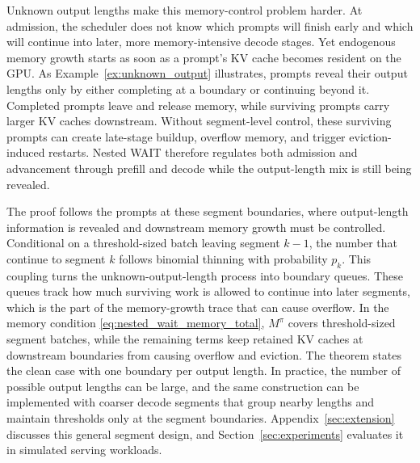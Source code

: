 Unknown output lengths make this memory-control problem harder. At admission, the scheduler does not know which prompts will finish early and which will continue into later, more memory-intensive decode stages. Yet endogenous memory growth starts as soon as a prompt's KV cache becomes resident on the GPU. As Example~\ref{ex:unknown_output} illustrates, prompts reveal their output lengths only by either completing at a boundary or continuing beyond it. Completed prompts leave and release memory, while surviving prompts carry larger KV caches downstream. Without segment-level control, these surviving prompts can create late-stage buildup, overflow memory, and trigger eviction-induced restarts. Nested WAIT therefore regulates both admission and advancement through prefill and decode while the output-length mix is still being revealed.

The proof follows the prompts at these segment boundaries, where output-length information is revealed and downstream memory growth must be controlled. Conditional on a threshold-sized batch leaving segment \(k-1\), the number that continue to segment \(k\) follows binomial thinning with probability \(p_k\). This coupling turns the unknown-output-length process into boundary queues. These queues track how much surviving work is allowed to continue into later segments, which is the part of the memory-growth trace that can cause overflow. In the memory condition \eqref{eq:nested_wait_memory_total}, \(M^\pi\) covers threshold-sized segment batches, while the remaining terms keep retained KV caches at downstream boundaries from causing overflow and eviction. The theorem states the clean case with one boundary per output length. In practice, the number of possible output lengths can be large, and the same construction can be implemented with coarser decode segments that group nearby lengths and maintain thresholds only at the segment boundaries. Appendix~\ref{sec:extension} discusses this general segment design, and Section~\ref{sec:experiments} evaluates it in simulated serving workloads.

